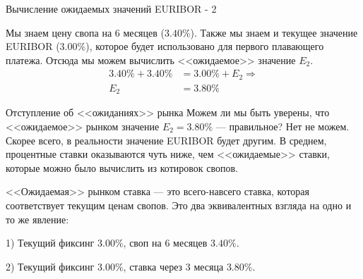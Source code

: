 \documentclass{beamer}
\begin{document}
\begin{frame}{Вычисление ожидаемых значений EURIBOR - 2}
\centering
{}

\justify
Мы знаем цену свопа на 6 месяцев ($3.40\%$). Также мы знаем и текущее значение EURIBOR ($3.00\%$), которое будет использовано для первого плавающего платежа. Отсюда мы можем вычислить <<ожидаемое>> значение $E_2$.
\begin{align*}
3.40\% + 3.40\% &= 3.00\% + E_2 \Rightarrow \\
E_2 &= 3.80\%
\end{align*}

\end{frame}



\begin{frame}{Отступление об <<ожиданиях>> рынка}
\justify
Можем ли мы быть уверены, что <<ожидаемое>> рынком значение $E_2=3.80\%$ --- правильное? Нет не можем. Скорее всего, в реальности значение EURIBOR будет другим. В среднем, процентные ставки оказываются чуть ниже, чем <<ожидаемые>> ставки, которые можно было вычислить из котировок свопов.

\justify
<<Ожидаемая>> рынком ставка --- это всего-навсего ставка, которая соответствует текущим ценам свопов. Это два эквивалентных взгляда на одно и то же явление:

1) Текущий фиксинг $3.00\%$, своп на 6 месяцев $3.40\%$.

2) Текущий фиксинг $3.00\%$, ставка через 3 месяца $3.80\%$.
\end{frame}
\end{document}
